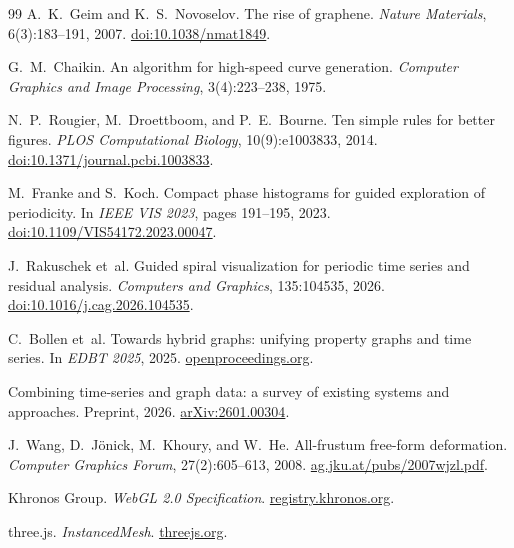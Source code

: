 \documentclass[11pt,a4paper]{article}
\theoremstyle{definition}
\begin{document}
\begin{thebibliography}{99}
A.~K.~Geim and K.~S.~Novoselov.
\newblock The rise of graphene.
\newblock \emph{Nature Materials}, 6(3):183--191, 2007.
\newblock \href{https://doi.org/10.1038/nmat1849}{doi:10.1038/nmat1849}.

G.~M.~Chaikin.
\newblock An algorithm for high-speed curve generation.
\newblock \emph{Computer Graphics and Image Processing}, 3(4):223--238, 1975.

N.~P.~Rougier, M.~Droettboom, and P.~E.~Bourne.
\newblock Ten simple rules for better figures.
\newblock \emph{PLOS Computational Biology}, 10(9):e1003833, 2014.
\newblock \href{https://doi.org/10.1371/journal.pcbi.1003833}{doi:10.1371/journal.pcbi.1003833}.

M.~Franke and S.~Koch.
\newblock Compact phase histograms for guided exploration of periodicity.
\newblock In \emph{IEEE VIS 2023}, pages 191--195, 2023.
\newblock \href{https://doi.org/10.1109/VIS54172.2023.00047}{doi:10.1109/VIS54172.2023.00047}.

J.~Rakuschek et~al.
\newblock Guided spiral visualization for periodic time series and residual
  analysis.
\newblock \emph{Computers and Graphics}, 135:104535, 2026.
\newblock \href{https://doi.org/10.1016/j.cag.2026.104535}{doi:10.1016/j.cag.2026.104535}.

C.~Bollen et~al.
\newblock Towards hybrid graphs: unifying property graphs and time series.
\newblock In \emph{EDBT 2025}, 2025.
\newblock \href{https://openproceedings.org/2025/conf/edbt/paper-183.pdf}{openproceedings.org}.

Combining time-series and graph data: a survey of existing systems and
  approaches.
\newblock Preprint, 2026.
\newblock \href{https://arxiv.org/abs/2601.00304}{arXiv:2601.00304}.

J.~Wang, D.~J{\"o}nick, M.~Khoury, and W.~He.
\newblock All-frustum free-form deformation.
\newblock \emph{Computer Graphics Forum}, 27(2):605--613, 2008.
\newblock \href{https://www.ag.jku.at/pubs/2007wjzl.pdf}{ag.jku.at/pubs/2007wjzl.pdf}.

Khronos Group.
\newblock \emph{WebGL 2.0 Specification}.
\newblock \href{https://registry.khronos.org/webgl/specs/2.0.0/}{registry.khronos.org}.

three.js.
\newblock \emph{InstancedMesh}.
\newblock \href{https://threejs.org/docs/\#api/en/objects/InstancedMesh}{threejs.org}.

\end{thebibliography}
\end{document}
